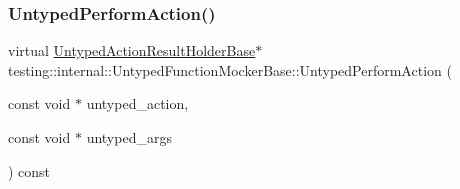 \subsubsection{\texorpdfstring{Untyped\+Perform\+Action()}{UntypedPerformAction()}}
{\footnotesize\ttfamily virtual \hyperlink{classtesting_1_1internal_1_1_untyped_action_result_holder_base}{Untyped\+Action\+Result\+Holder\+Base}$\ast$ testing\+::internal\+::\+Untyped\+Function\+Mocker\+Base\+::\+Untyped\+Perform\+Action (\begin{DoxyParamCaption}\item[{const void $\ast$}]{untyped\+\_\+action,  }\item[{const void $\ast$}]{untyped\+\_\+args }\end{DoxyParamCaption}) const\hspace{0.3cm}{\ttfamily [pure virtual]}}



